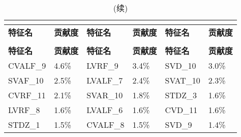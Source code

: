 \begin{center}
      \begin{longtable}{m{2cm}<{\centering}m{2cm}<{\centering}m{2cm}<{\centering}m{2cm}<{\centering}m{2cm}<{\centering}m{2cm}<{\centering}}
            \caption[参与构建随机森林的特征贡献度（部分）]{参与构建随机森林的特征贡献度（部分）}\\
            \label{tab:rf_dr_1}\\
            \toprule
            \textbf{特征名}&\textbf{贡献度}&\textbf{特征名}&\textbf{贡献度}&\textbf{特征名}&\textbf{贡献度}\\
            \midrule
            \endfirsthead
            \caption[]{(续)}\\
            \midrule
            \textbf{特征名}&\textbf{贡献度}&\textbf{特征名}&\textbf{贡献度}&\textbf{特征名}&\textbf{贡献度}\\
            \midrule
            \endhead 
            \midrule
            \endfoot
            \bottomrule
            \endlastfoot
            \cellcolor{cyan}CVALF\_9                         & \cellcolor{cyan}4.6\%                            & \cellcolor{cyan}LVRF\_9                          & \cellcolor{cyan}3.4\%                            & SVD\_10                          & 3.0\%                            \\
            \cellcolor{cyan}SVAF\_10                         & \cellcolor{cyan}2.5\%                            & \cellcolor{cyan}LVALF\_7                         & \cellcolor{cyan}2.4\%                            & SVAT\_10                         & 2.3\%                            \\
            \cellcolor{cyan}CVRF\_11                         & \cellcolor{cyan}2.1\%                            & \cellcolor{pink}SVAR\_10                         & \cellcolor{pink}1.8\%                            & STDZ\_3                          & 1.6\%                            \\
            \cellcolor{cyan}LVRF\_8                          & \cellcolor{cyan}1.6\%                            & \cellcolor{cyan}LVALF\_6                         & \cellcolor{cyan}1.6\%                            & CVD\_11                          & 1.6\%                            \\
            STDZ\_1                                          & 1.5\%                                            & \cellcolor{cyan}CVALF\_8                         & \cellcolor{cyan}1.5\%                            & SVD\_9                           & 1.4\%                            \\

\end{longtable}
\end{center}
